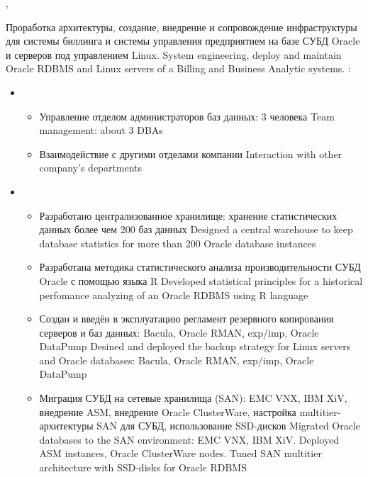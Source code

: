 \documentclass[11pt,a4paper,sans, russian]{moderncv}        %
\begin{document}
{\protect{}}
{\cityperm, \country}
{}
{
	{Проработка архитектуры, создание, внедрение и сопровождение инфраструктуры для системы биллинга и системы управления предприятием на базе СУБД Oracle и серверов под управлением Linux.}
	{System engineering, deploy and maintain Oracle RDBMS and Linux servers of a Billing and Business Analytic systems.}\newline{}
	\achievements:
	\begin{itemize}	
	\item {}	
		\begin{itemize}
			\item {}
				{Управление отделом администраторов баз данных: 3 человека}
				{Team management: about 3 DBAs}
			\item {}
				{Взаимодействие с другими отделами компании}
				{Interaction with other company's departments}
		\end{itemize}
	\item {}
		\begin{itemize}
			\item {}
				{Разработано централизованное хранилище: хранение статистических данных более чем 200 баз данных}
				{Designed a central warehouse to keep database statistics for more than 200 Oracle database instances}
			\item {}
				{Разработана методика статистического анализа производительности СУБД Oracle с помощью языка R}
				{Developed statistical principles for a historical perfomance analyzing of an Oracle RDBMS using R language}
			\item {}
				{Создан и введён в эксплуатацию регламент резервного копирования серверов и баз данных: Bacula, Oracle RMAN, exp/imp, Oracle DataPump}
				{Desined and deployed the backup strategy for Linux servers and Oracle databases: Bacula, Oracle RMAN, exp/imp, Oracle DataPump}
			\item {}
				{Миграция СУБД на сетевые хранилища (SAN): EMC VNX, IBM XiV, внедрение ASM, внедрение Oracle ClusterWare, настройка multitier-архитектуры SAN для СУБД, использование SSD-дисков}
				{Migrated Oracle databases to the SAN environment: EMC VNX, IBM XiV. Deployed ASM instances, Oracle ClusterWare nodes. Tuned SAN multitier architecture with SSD-disks for Oracle RDBMS}

\end{itemize}
\end{itemize}}
\end{document}
